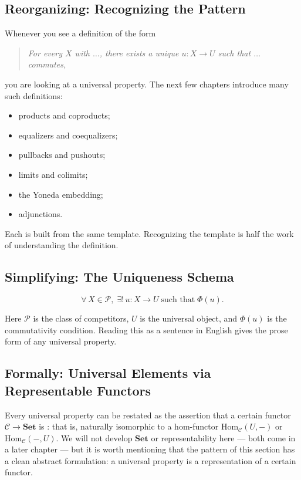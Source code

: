 \subsection{Reorganizing: Recognizing the Pattern}

Whenever you see a definition of the form
\begin{quote}
  \textit{For every $X$ with $\ldots$, there exists a unique $u : X \to U$
  such that $\ldots$ commutes,}
\end{quote}
you are looking at a universal property. The next few chapters introduce
many such definitions:
\begin{itemize}
  \item products and coproducts;
  \item equalizers and coequalizers;
  \item pullbacks and pushouts;
  \item limits and colimits;
  \item the Yoneda embedding;
  \item adjunctions.
\end{itemize}
Each is built from the same template. Recognizing the template is half the
work of understanding the definition.

\subsection{Simplifying: The Uniqueness Schema}

\begin{equation*}
  \forall\, X \in \mathcal{P},\; \exists !\, u : X \to U \;\text{such that}\; \Phi(u).
\end{equation*}

Here $\mathcal{P}$ is the class of competitors, $U$ is the universal object,
and $\Phi(u)$ is the commutativity condition. Reading this as a sentence
in English gives the prose form of any universal property.

\subsection{Formally: Universal Elements via Representable Functors}

Every universal property can be restated as the assertion that a certain
functor $\mathcal{C} \to \mathbf{Set}$ is : that is,
naturally isomorphic to a hom-functor $\mathrm{Hom}_\mathcal{C}(U, -)$ or
$\mathrm{Hom}_\mathcal{C}(-, U)$. We will not develop $\mathbf{Set}$ or
representability here --- both come in a later chapter --- but it is worth
mentioning that the pattern of this section has a clean abstract
formulation: a universal property is a representation of a certain
functor.



